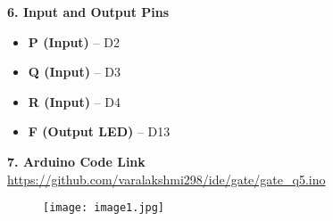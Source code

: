 \documentclass[12pt]{article}
\begin{document}
\begin{flushleft}
\noindent\textbf{6. Input and Output Pins}
\begin{itemize}
    \item \textbf{P (Input)} – D2
    \item \textbf{Q (Input)} – D3
    \item \textbf{R (Input)} – D4
    \item \textbf{F (Output LED)} – D13
\end{itemize}
\noindent\textbf{7. Arduino Code Link}\\
\url{https://github.com/varalakshmi298/ide/gate/gate_q5.ino}
\end{flushleft}
\vspace{1em}
\begin{figure}[H]
\texttt{[image: image1.jpg]}
\end{figure}
\end{document}
